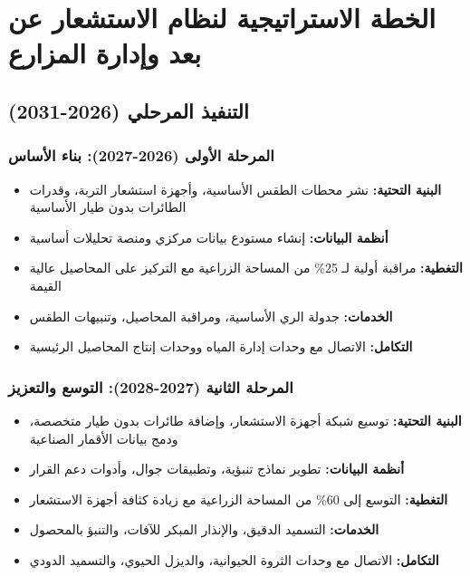 \section{الخطة الاستراتيجية لنظام الاستشعار عن بعد وإدارة المزارع}

\subsection{التنفيذ المرحلي (2026-2031)}

\subsubsection{المرحلة الأولى (2026-2027): بناء الأساس}
\begin{itemize}
    \item \textbf{البنية التحتية:} نشر محطات الطقس الأساسية، وأجهزة استشعار التربة، وقدرات الطائرات بدون طيار الأساسية
    \item \textbf{أنظمة البيانات:} إنشاء مستودع بيانات مركزي ومنصة تحليلات أساسية
    \item \textbf{التغطية:} مراقبة أولية لـ 25\% من المساحة الزراعية مع التركيز على المحاصيل عالية القيمة
    \item \textbf{الخدمات:} جدولة الري الأساسية، ومراقبة المحاصيل، وتنبيهات الطقس
    \item \textbf{التكامل:} الاتصال مع وحدات إدارة المياه ووحدات إنتاج المحاصيل الرئيسية
\end{itemize}

\subsubsection{المرحلة الثانية (2027-2028): التوسع والتعزيز}
\begin{itemize}
    \item \textbf{البنية التحتية:} توسيع شبكة أجهزة الاستشعار، وإضافة طائرات بدون طيار متخصصة، ودمج بيانات الأقمار الصناعية
    \item \textbf{أنظمة البيانات:} تطوير نماذج تنبؤية، وتطبيقات جوال، وأدوات دعم القرار
    \item \textbf{التغطية:} التوسع إلى 60\% من المساحة الزراعية مع زيادة كثافة أجهزة الاستشعار
    \item \textbf{الخدمات:} التسميد الدقيق، والإنذار المبكر للآفات، والتنبؤ بالمحصول
    \item \textbf{التكامل:} الاتصال مع وحدات الثروة الحيوانية، والديزل الحيوي، والتسميد الدودي
\end{itemize}

